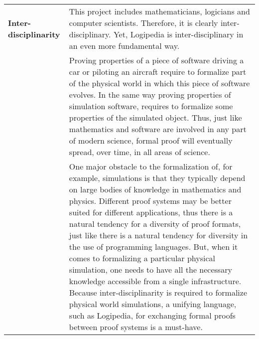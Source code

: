 \begin{longtable}{|p{}|p{}|}
{\bf Inter-disciplinarity}
&
This project includes mathematicians, logicians and computer
scientists. Therefore, it is clearly inter-disciplinary.
Yet, Logipedia is inter-disciplinary in an even more fundamental
way. 
\\

&
\hspace{0.4cm}
Proving properties of a piece of software driving a car or
piloting an aircraft require to formalize part of the physical world
in which this piece of software evolves. In the same way proving
properties of simulation software, requires to formalize some
properties of the simulated object.  Thus, just like mathematics and
software are involved in any part of modern science, formal proof will
eventually spread, over time, in all areas of science.\\
&
\hspace{0.4cm}
One major obstacle to the formalization of, for example, simulations
is that they typically depend on large bodies of knowledge in
mathematics and physics.  Different proof systems may be better
suited for different applications, thus there is a natural tendency
for a diversity of proof formats, just like there is a natural
tendency for diversity in the use of programming languages.  But, when
it comes to formalizing a particular physical simulation, one needs to
have all the necessary knowledge accessible from a single infrastructure.
Because inter-disciplinarity is required to formalize physical world
simulations, a unifying language, such as Logipedia, for exchanging
formal proofs between proof systems is a must-have.\\
\hline
\end{longtable}
